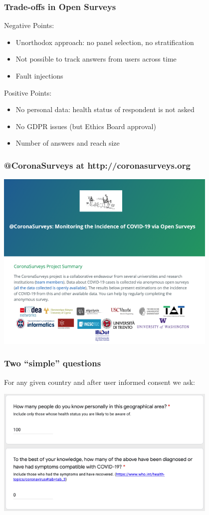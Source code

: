 \documentclass{beamer}
\begin{document}
\begin{frame}
  \frametitle{Trade-offs in Open Surveys}
 Negative Points: 
  \begin{itemize}
    \item Unorthodox approach: no panel selection, no stratification
    \item Not possible to track answers from users across time
    \item Fault injections
  \end{itemize}
 Positive Points:
  \begin{itemize}
    \item No personal data: health status of respondent is not asked
    \item No GDPR issues \hfill (but Ethics Board approval)
    \item Number of answers and reach size

  \end{itemize}
\end{frame}

\begin{frame}
  \frametitle{@CoronaSurveys at http://coronasurveys.org}
  \begin{center}
  \includegraphics[width=0.8\textwidth]{CoronaSurveys.png}
  \end{center}
\end{frame}

\begin{frame}
  \frametitle{Two ``simple'' questions}
  For any given country and after user informed consent we ask:
  \begin{center}
  \includegraphics[width=0.8\textwidth]{Questions.png}
  \end{center}
\end{frame}
\end{document}
